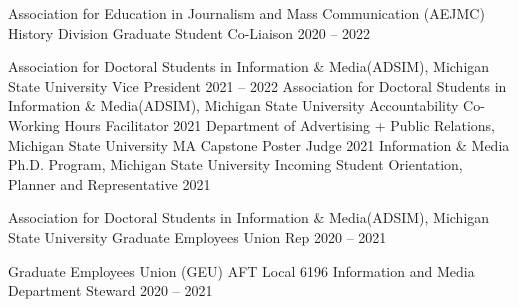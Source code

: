 

\begin{cvhonors}
  \cvhonor
    {Association for Education in Journalism and Mass Communication (AEJMC) History Division} %
    {Graduate Student Co-Liaison } %
    {} %
    {2020 -- 2022} %
 
\end{cvhonors}
\pagebreak
{}
\begin{cvhonors}
      \cvhonor
    {Association for Doctoral Students in Information \& Media(ADSIM), Michigan State University } %
    {Vice President } %
    {} %
    {2021 -- 2022} %
    \cvhonor
    {Association for Doctoral Students in Information \& Media(ADSIM), Michigan State University } %
    {Accountability Co-Working Hours Facilitator } %
    {} %
    {2021} %
  \cvhonor
    {Department of Advertising + Public Relations, Michigan State University } %
    {MA Capstone Poster Judge } %
    {} %
    {2021} %
 \cvhonor
    {Information \& Media Ph.D. Program, Michigan State University} %
    {Incoming Student Orientation, Planner and Representative } %
    {} %
    {2021} %
    
  \cvhonor
    {Association for Doctoral Students in Information \& Media(ADSIM), Michigan State University } %
    {Graduate Employees Union Rep } %
    {} %
    {2020 -- 2021} %

  \cvhonor
    {Graduate Employees Union (GEU) AFT Local 6196} %
    {Information and Media Department Steward } %
    {} %
    {2020 -- 2021} %
\end{cvhonors}

